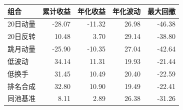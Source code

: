 \begin{tabular}{lrrrr}
\toprule
组合 & 累计收益 & 年化收益 & 年化波动 & 最大回撤\\
\midrule
20日动量 & -28.07 & -11.32 & 26.98 & -46.38\\
20日反转 & 10.48 & 3.70 & 29.14 & -38.80\\
跳月动量 & -25.90 & -10.35 & 27.04 & -42.64\\
低波动 & 34.14 & 11.31 & 19.93 & -21.44\\
低换手 & 31.45 & 10.49 & 20.40 & -22.59\\
排名合成 & 32.80 & 10.90 & 19.49 & -22.41\\
同池基准 & 8.11 & 2.89 & 26.38 & -31.26\\
\bottomrule
\end{tabular}
